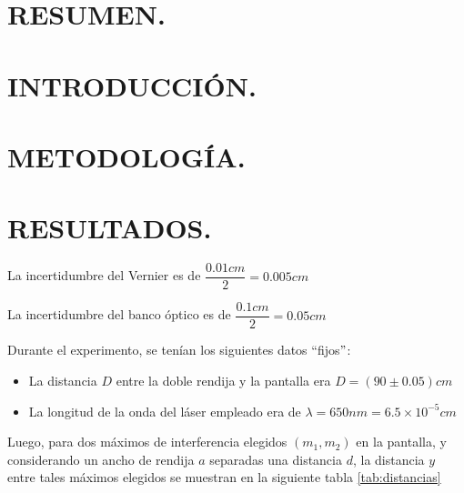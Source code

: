 \documentclass[10pt,a4paper]{article}
\begin{document}
\portada

\section{RESUMEN.} %

\section{INTRODUCCIÓN.} %


\section{METODOLOGÍA.} %

\section{RESULTADOS.} %

  La incertidumbre del Vernier es de $ \dfrac{0.01 cm}{2}=0.005 cm $
	 
	 La incertidumbre del banco óptico es de $ \dfrac{0.1 cm}{2}=0.05 cm $
	 
	 
	 Durante el experimento, se tenían los siguientes datos ``fijos$"$:
	 
	 \begin{itemize}
	 	\item La distancia $ D $ entre la doble rendija y la pantalla era $ D=(90\pm 0.05) cm$
	 	\item La longitud de la onda del láser empleado era de $ \lambda=650 nm=6.5\times 10^{-5}cm $
	 \end{itemize}
 
 	Luego, para dos máximos de interferencia elegidos $ (m_1, m_2) $ en la pantalla, y considerando un ancho de rendija $ a $ separadas una distancia $ d $, la distancia $ y $ entre tales máximos elegidos se muestran en la siguiente tabla \ref{tab:distancias}
 	
\end{document}
